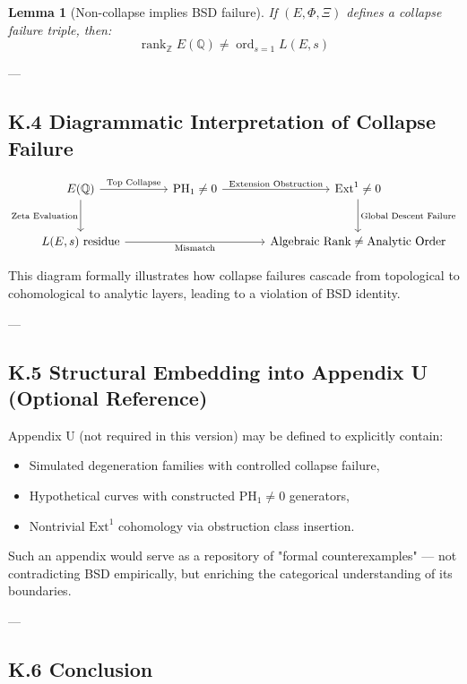 \documentclass[11pt]{article}
\newtheorem{lemma}[theorem]{Lemma}
\begin{document}
\begin{lemma}[Non-collapse implies BSD failure]
If $(E, \Phi, \Xi)$ defines a collapse failure triple, then:
\[
\operatorname{rank}_{\mathbb{Z}} E(\mathbb{Q}) \neq \operatorname{ord}_{s=1} L(E,s)
\]
\end{lemma}

---

\subsection*{K.4 Diagrammatic Interpretation of Collapse Failure}

\[
\begin{tikzcd}[row sep=large, column sep=large]
E(\mathbb{Q}) \arrow[r, "\text{Top Collapse}"] \arrow[d, swap, "\text{Zeta Evaluation}"]
& \mathrm{PH}_1 \neq 0 \arrow[r, "\text{Extension Obstruction}"]
& \mathrm{Ext}^1 \neq 0 \arrow[d, "\text{Global Descent Failure}"] \\
L(E,s) \text{ residue} \arrow[rr, swap, "\text{Mismatch}"]
&& \text{Algebraic Rank} \neq \text{Analytic Order}
\end{tikzcd}
\]


This diagram formally illustrates how collapse failures cascade from topological to cohomological to analytic layers, leading to a violation of BSD identity.

---

\subsection*{K.5 Structural Embedding into Appendix U (Optional Reference)}

Appendix U (not required in this version) may be defined to explicitly contain:
\begin{itemize}
  \item Simulated degeneration families with controlled collapse failure,
  \item Hypothetical curves with constructed $\mathrm{PH}_1 \neq 0$ generators,
  \item Nontrivial $\mathrm{Ext}^1$ cohomology via obstruction class insertion.
\end{itemize}

Such an appendix would serve as a repository of "formal counterexamples" — not contradicting BSD empirically, but enriching the categorical understanding of its boundaries.

---

\subsection*{K.6 Conclusion}
\end{document}
